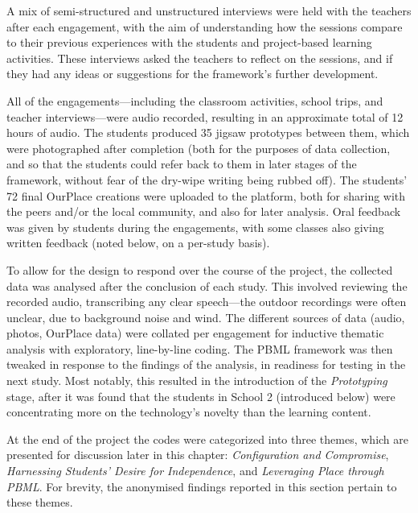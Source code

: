 A mix of semi-structured and unstructured interviews were held with the teachers after each engagement, with the aim of understanding how the sessions compare to their previous experiences with the students and project-based learning activities. These interviews asked the teachers to reflect on the sessions, and if they had any ideas or suggestions for the framework's further development.

All of the engagements---including the classroom activities, school trips, and teacher interviews---were audio recorded, resulting in an approximate total of 12 hours of audio. The students produced 35 jigsaw prototypes between them, which were photographed after completion (both for the purposes of data collection, and so that the students could refer back to them in later stages of the framework, without fear of the dry-wipe writing being rubbed off). The students' 72 final OurPlace creations were uploaded to the platform, both for sharing with the peers and/or the local community, and also for later analysis. Oral feedback was given by students during the engagements, with some classes also giving written feedback (noted below, on a per-study basis).

To allow for the design to respond over the course of the project, the collected data was analysed after the conclusion of each study. This involved reviewing the recorded audio, transcribing any clear speech---the outdoor recordings were often unclear, due to background noise and wind. The different sources of data (audio, photos, OurPlace data) were collated per engagement for inductive thematic analysis with exploratory, line-by-line coding. The PBML framework was then tweaked in response to the findings of the analysis, in readiness for testing in the next study. Most notably, this resulted in the introduction of the \textit{Prototyping} stage, after it was found that the students in School 2 (introduced below) were concentrating more on the technology's novelty than the learning content.

At the end of the project the codes were categorized into three themes, which are presented for discussion later in this chapter: \textit{Configuration and Compromise}, \textit{Harnessing Students' Desire for Independence}, and \textit{Leveraging Place through PBML}. For brevity, the anonymised findings reported in this section pertain to these themes.

